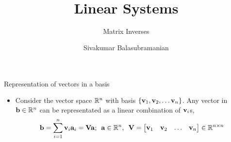 \documentclass[aspectratio=169]{beamer}
\title{Linear Systems}
\subtitle{Matrix Inverses}
\author{Sivakumar Balasubramanian}
\institute[Christian Medical College] %
{
  \inst{}%
  Department of Bioengineering\\
  Christian Medical College, Bagayam\\
  Vellore 632002
}
\date{}
\let\olditem\item
\renewcommand{\item}{\setlength{\itemsep}{\fill}\olditem}
\def\mf{\ensuremath\mathbf}
\def\mb{\ensuremath\mathbb}
\begin{document}
\begin{frame}
  \titlepage
\end{frame}



\begin{frame}[t]{Representation of vectors in a basis}
\begin{itemize}
\item Consider the vector space $\mb{R}^n$ with basis $\left\{\mf{v}_1, \mf{v}_2, \ldots \mf{v}_n\right\}$. Any vector in $\mf{b} \in \mb{R}^n$ can be representated as a linear combination of $\mf{v}_i$s,
\[ \mf{b} = \sum_{i=1}^{n} \mf{v}_i\mf{a}_i = \mf{V}\mf{a}; \,\,\, \mf{a} \in \mb{R}^n, \,\,\, \mf{V} = \begin{bmatrix*}\mf{v}_1 & \mf{v}_2 & \ldots & \mf{v}_n\end{bmatrix*} \in \mb{R}^{n \times n} \]


\end{itemize}
\end{frame}
\end{document}
